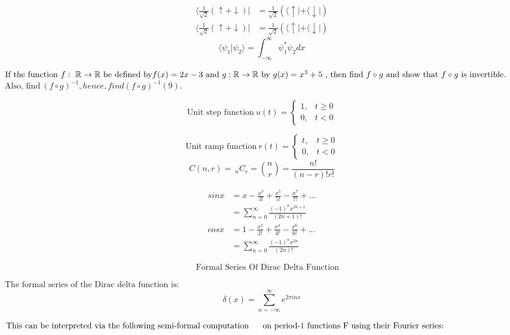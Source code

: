 \documentclass{article}
\begin{document}
\begin{align*}
    \bigg\langle\frac{1}{\sqrt2}(\uparrow+\downarrow) \biggr\rvert&= \frac{1}{\sqrt2}(\langle\uparrow \! |+\langle\downarrow \! |) \\
    \langle\frac{1}{\sqrt2}(\uparrow+\downarrow)|&= \frac{1}{\sqrt2}(\langle\uparrow \! |+\langle\downarrow \! |)
\end{align*}
\pagebreak
$$\langle \psi_1 | \psi_2\rangle= \int_ {-\infty}^{\infty}\psi_1^*\psi_2dx$$
\pagebreak

\noindent $\text{If the function } f: \ \mathbb{R} \rightarrow \mathbb{R} \text{ be defined by} f(x) = 2x - 3 \ \text{and} \  g: \mathbb{R} \rightarrow \mathbb{R} \\ \ \text{by} \ g(x) = x ^ 3 + 5 \text{ , then find} \ f \circ g \ \text{and show that} \    f\circ g \ \text{is invertible.}$ 
\\ 

\noindent $ \text{Also, find} \  (f\circ g)^{-1} ,{hence, find} (f\circ g)^{-1}(9). $

\pagebreak

$$\text{Unit step function} \ u(t) =  \begin{cases}
    1,  & t \ge0 \\[2ex]
    0, & t < 0
    \end{cases}$$
    
    $$\text{Unit ramp function} \ r(t) = \begin{cases}
    t,  & t \ge0 \\[2ex]
    0, & t< 0
    \end{cases}$$
\pagebreak
$$C (n,r)= \ _n{C}_r = \binom n r = \frac{ n!}{(n-r)!r!}$$




\pagebreak
\begin{align*}
sinx&= x- \frac{x^ 3}{3!} +  \frac{x^ 5}{5!} - \frac{x^7}{7!} +...\\
 &= \sum_{n=0}^{\infty}\frac{(-1)^n x^{2n+1}}{ (2n+1)!} \\
cosx&= 1- \frac{x^ 2}{2!} +  \frac{x^ 4}{4!} - \frac{x^6}{6!} +...\\
 &= \sum_{n=0}^{\infty}\frac{(-1)^n x^{2n}}{ (2n)!} 
\end{align*}

\pagebreak
$$\ \ \ \ \ \ \text{Formal  Series\ Of  Dirac Delta Function}$$ 

$\text{The formal series of the Dirac delta function is:}$
$$\delta(x)=\sum_{n=-\infty}^{\infty}e^{2\pi inx}$$

$\text{This can be interpreted via the following semi-formal computation} \\ \text{\ \ \ \ \  on period-1 functions F using their Fourier series:}$
\end{document}
